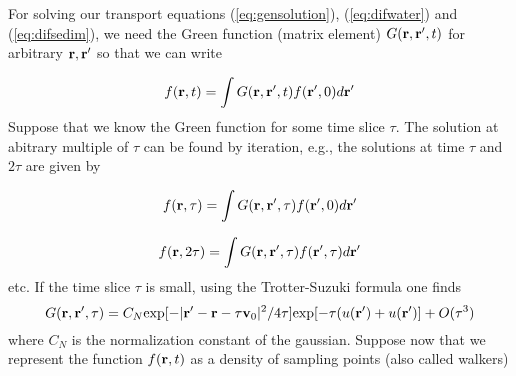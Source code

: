 \documentclass[fleqn,12pt,twoside]{article}
\begin{document}
For solving our transport equations (\ref{eq:gensolution}),
  (\ref{eq:difwater}) and  (\ref{eq:difsedim}),
we need the Green function (matrix element)
$G( {\bf r},  {\bf r'},t)$
for arbitrary ${\bf r},{\bf r'}$ so that we can write

\begin{equation}
f({\bf r},t) = 
\int G( {\bf r},  {\bf r'},t) f({\bf r'},0)d{\bf r'}
\end{equation}
Suppose that we know the Green function for some time slice $\tau$.
The solution at abitrary  multiple of $\tau$ can be found by
iteration, e.g.,
the solutions at time $\tau$ and $2\tau$ are given by

\begin{equation}
f({\bf r},\tau) = 
\int G({\bf r}, {\bf r'},\tau) f({\bf r'},0) 
d{\bf r'}
\end{equation}

\begin{equation}
f({\bf r},2\tau) = 
\int G({\bf r}, {\bf r'},\tau) 
f({\bf r'},\tau)d{\bf r'}
\end{equation}
etc.
%
If the time slice $\tau$ is small, using the Trotter-Suzuki formula
one finds
\begin{equation}
G({\bf r}, {\bf r'},\tau)=
C_N {\rm exp}[-|{\bf r'}-{\bf r}-\tau{\bf v}_0|^2/4\tau]
{\rm exp}[-\tau(u({\bf r'})+u({\bf r'})] + O(\tau^3)
\end{equation}
where $C_N$ is the normalization constant of the gaussian.
Suppose now that we represent the function 
$f({\bf r},t)$ as a density of sampling points (also called walkers)
\end{document}
